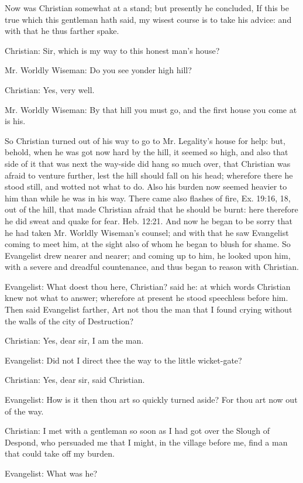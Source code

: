 Now was Christian somewhat at a stand; but presently he concluded, If this be true which this gentleman hath said, my wisest course is to take his advice: and with that he thus farther spake. 

Christian: Sir, which is my way to this honest man's house? 

Mr. Worldly Wiseman: Do you see yonder high hill? 

Christian: Yes, very well. 

Mr. Worldly Wiseman: By that hill you must go, and the first house you come at is his. 

So Christian turned out of his way to go to Mr. Legality's house for help: but, behold, when he was got now hard by the hill, it seemed so high, and also that side of it that was next the way-side did hang so much over, that Christian was afraid to venture further, lest the hill should fall on his head; wherefore there he stood still, and wotted not what to do. Also his burden now seemed heavier to him than while he was in his way. There came also flashes of fire, Ex. 19:16, 18, out of the hill, that made Christian afraid that he should be burnt: here therefore he did sweat and quake for fear. Heb. 12:21. And now he began to be sorry that he had taken Mr. Worldly Wiseman's counsel; and with that he saw Evangelist coming to meet him, at the sight also of whom he began to blush for shame. So Evangelist drew nearer and nearer; and coming up to him, he looked upon him, with a severe and dreadful countenance, and thus began to reason with Christian. 

Evangelist: What doest thou here, Christian? said he: at which words Christian knew not what to answer; wherefore at present he stood speechless before him. Then said Evangelist farther, Art not thou the man that I found crying without the walls of the city of Destruction? 

Christian: Yes, dear sir, I am the man. 

Evangelist: Did not I direct thee the way to the little wicket-gate? 

Christian: Yes, dear sir, said Christian. 

Evangelist: How is it then thou art so quickly turned aside? For thou art now out of the way. 

Christian: I met with a gentleman so soon as I had got over the Slough of Despond, who persuaded me that I might, in the village before me, find a man that could take off my burden. 

Evangelist: What was he? 

